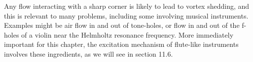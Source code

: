 
  Any flow interacting with a sharp corner is likely to lead to vortex 
  shedding, and this is relevant to many problems, including some involving 
  musical instruments. Examples might be air flow in and out of tone-holes, or 
  flow in and out of the f-holes of a violin near the Helmholtz resonance 
  frequency. More immediately important for this chapter, the excitation 
  mechanism of flute-like instruments involves these ingredients, as we will 
  see in section 11.6. 